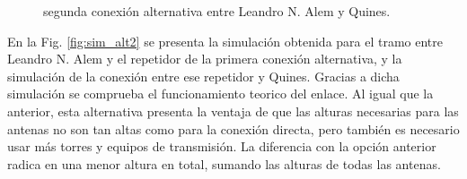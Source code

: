 \documentclass[11pt,a4paper]{article}
\begin{document}
\begin{figure}[ht!]
  \centering
  \quad
  \quad
  \caption{segunda conexión alternativa entre Leandro N. Alem y Quines.}
  \label{fig:con_alt2}
\end{figure}

En la Fig. \ref{fig:sim_alt2} se presenta la simulación obtenida para el tramo entre Leandro N. Alem y el repetidor de la primera conexión alternativa, y la simulación de la conexión entre ese repetidor y Quines.
Gracias a dicha simulación se comprueba el funcionamiento teorico del enlace.
Al igual que la anterior, esta alternativa presenta la ventaja de que las alturas necesarias para las antenas no son tan altas como para la conexión directa, pero también es necesario usar más torres y equipos de transmisión. 
La diferencia con la opción anterior radica en una menor altura en total, sumando las alturas de todas las antenas.
\end{document}
